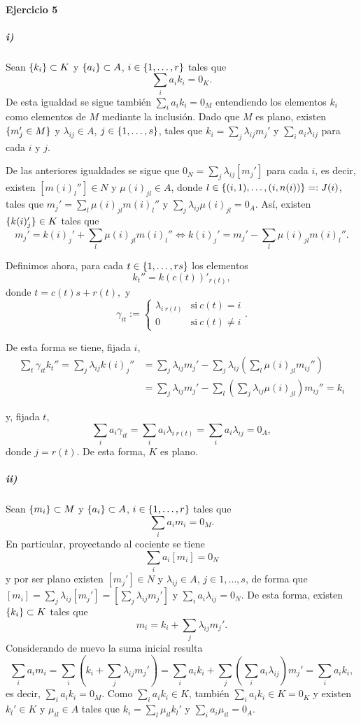 \documentclass[../main.tex]{subfiles}
\begin{document}
\paragraph{Ejercicio 5}
\subparagraph{i)} Sean $\{k_i\}\subset K$ y $\{a_i\}\subset A$, $i\in\{1,\dots,r\}$ tales que
$$\sum_{i}a_ik_i=0_K.$$
De esta igualdad se sigue también $\sum_{i}a_ik_i=0_M$ entendiendo los elementos $k_i$ como elementos de $M$ mediante la inclusión. Dado que $M$ es plano, existen $\{m_j'\in M\}$ y $\lambda_{ij}\in A$, $j\in\{1,\dots, s\}$, tales que $k_i=\sum_j\lambda_{ij}m_j'$ y $\sum_i a_i\lambda_{ij}$ para cada $i$ y $j$. 

De las anteriores igualdades se sigue que $0_N=\sum_j\lambda_{ij}[m_j']$ para cada $i$, es decir, existen $[m(i)_{l}'']\in N$ y $\mu(i)_{jl}\in A$, donde $l\in\{(i,1),\dots,(i,n(i))\}=:J(i)$, tales que $m_j'=\sum_l\mu(i)_{jl}m(i)_l''$ y $\sum_{j}\lambda_{ij}\mu(i)_{jl}=0_A.$ Así, existen $\{k(i)_j'\}\in K$ tales que
$$m_j'=k(i)_j'+\sum_l\mu(i)_{jl}m(i)_l''\Longleftrightarrow k(i)_j'=m_{j}'-\sum_{l}\mu(i)_{jl}m(i)_l''.$$

Definimos ahora, para cada $t\in\{1,\dots,rs\}$ los elementos
$$k_t''=k(c(t))'_{r(t)},$$
donde $t=c(t)s+r(t),$ y
$$\gamma_{it}:=\left\{\begin{array}{cc}
    \lambda_{i\ r(t)}&\text{si}\ c(t)=i\\
    0&\text{si}\ c(t)\neq i
\end{array}\right..$$

De esta forma se tiene, fijada $i$,
\begin{align*}
    \sum_t\gamma_{it}k_t''=\sum_j\lambda_{ij}k(i)_{j}''&=\sum_j\lambda_{ij}m_j'-\sum_j\lambda_{ij}\left(\sum_l\mu(i)_{jl}m_{ij}''\right)\\
    &=\sum_j\lambda_{ij}m_j'-\sum_l\left(\sum_j\lambda_{ij}\mu(i)_{jl}\right)m_{ij}''=k_i
\end{align*}

y, fijada $t$,
$$\sum_i a_i\gamma_{it}=\sum_i a_i\lambda_{i\ r(t)}=\sum_i a_i\lambda_{ij}=0_A,$$
donde $j=r(t)$. De esta forma, $K$ es plano.

\subparagraph{ii)} Sean $\{m_i\}\subset M$ y $\{a_i\}\subset A$, $i\in\{1,\dots,r\}$ tales que
$$\sum_{i}a_im_i=0_M.$$
En particular, proyectando al cociente se tiene
$$\sum_{i}a_i[m_i]=0_N$$
y por ser plano existen $[m_j']\in N$ y $\lambda_{ij}\in A$, $j\in{1,\dots,s}$, de forma que $[m_i]=\sum_{j}\lambda_{ij}[m_j']=\left[\sum_{j}\lambda_{ij}m_j'\right]$ y $\sum_ia_i\lambda_{ij}=0_N$. De esta forma, existen $\{k_i\}\subset K$ tales que
$$m_i=k_i+\sum_{j}\lambda_{ij}m_j'.$$
Considerando de nuevo la suma inicial resulta
$$\sum_i a_im_i=\sum_i\left(k_i+\sum_{j}\lambda_{ij}m_j'\right)=\sum_i a_ik_i +\sum_j\left(\sum_ia_i\lambda_{ij}\right)m_j'=\sum_i a_ik_i,$$
es decir, $\sum_i a_ik_i=0_M$. Como $\sum_i a_ik_i\in K$, también $\sum_i a_ik_i\in K=0_K$ y existen $k_l'\in K$ y $\mu_{il}\in A$ tales que $k_i=\sum_l\mu_{il}k_l'$ y $\sum_i a_i\mu_{il}=0_A.$
\end{document}
